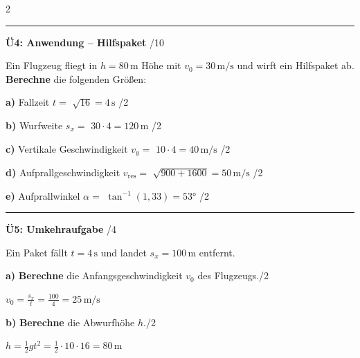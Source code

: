 \documentclass[10pt, a4paper]{article}
\newcommand{\fachfarbe}{physik}
\newcommand{\punkte}[1]{\hfill\small\textcolor{grau}{/#1}}
\newcommand{\lsg}[1]{\textcolor{loesung}{\textbf{#1}}}
\newcommand{\abschnitt}[1]{%
    \vspace{4pt}
    \noindent\textbf{\textcolor{\fachfarbe}{#1}}
    \vspace{2pt}
}
\begin{document}
\begin{multicols}{2}
\vspace{0.2cm}

\hrule
\vspace{4pt}


\abschnitt{Ü4: Anwendung -- Hilfspaket}\punkte{10}

Ein Flugzeug fliegt in $h = 80\,\text{m}$ Höhe mit $v_0 = 30\,\text{m/s}$ und wirft ein Hilfspaket ab. \textbf{Berechne} die folgenden Größen:

\textbf{a)} Fallzeit $t = $ \lsg{$\sqrt{16} = 4\,\text{s}$} \hfill\textcolor{grau}{\small/2}

\textbf{b)} Wurfweite $s_x = $ \lsg{$30 \cdot 4 = 120\,\text{m}$} \hfill\textcolor{grau}{\small/2}

\textbf{c)} Vertikale Geschwindigkeit $v_y = $ \lsg{$10 \cdot 4 = 40\,\text{m/s}$} \hfill\textcolor{grau}{\small/2}

\textbf{d)} Aufprallgeschwindigkeit $v_{\text{res}} = $ \lsg{$\sqrt{900 + 1600} = 50\,\text{m/s}$} \hfill\textcolor{grau}{\small/2}

\textbf{e)} Aufprallwinkel $\alpha = $ \lsg{$\tan^{-1}(1{,}33) = 53°$} \hfill\textcolor{grau}{\small/2}

\vspace{0.1cm}
\hrule
\vspace{4pt}


\abschnitt{Ü5: Umkehraufgabe}\punkte{4}

Ein Paket fällt $t = 4\,\text{s}$ und landet $s_x = 100\,\text{m}$ entfernt.

\textbf{a)} \textbf{Berechne} die Anfangsgeschwindigkeit $v_0$ des Flugzeugs.\hfill\textcolor{grau}{\small/2}

\lsg{$v_0 = \frac{s_x}{t} = \frac{100}{4} = 25\,\text{m/s}$}

\vspace{0.3cm}

\textbf{b)} \textbf{Berechne} die Abwurfhöhe $h$.\hfill\textcolor{grau}{\small/2}

\lsg{$h = \frac{1}{2} g t^2 = \frac{1}{2} \cdot 10 \cdot 16 = 80\,\text{m}$}

\vspace{0.2cm}

\end{multicols}
\end{document}
